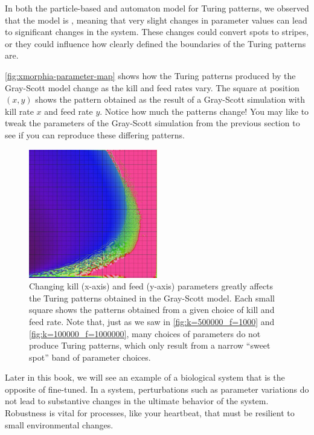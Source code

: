 In both the particle-based and automaton model for Turing patterns, we observed that the model is , meaning that very slight changes in parameter values can lead to significant changes in the system. These changes could convert spots to stripes, or they could influence how clearly defined the boundaries of the Turing patterns are.

\autoref{fig:xmorphia-parameter-map} shows how the Turing patterns produced by the Gray-Scott model change as the kill and feed rates vary. The square at position $(x, y)$ shows the pattern obtained as the result of a Gray-Scott simulation with kill rate $x$ and feed rate $y$. Notice how much the patterns change! You may like to tweak the parameters of the Gray-Scott simulation from the previous section to see if you can reproduce these differing patterns.\\

\begin{figure}[h]
\centering
\mySfFamily
\includegraphics[width = 0.5\textwidth]{../images_CMYK/xmorphia-parameter-map}
\caption{Changing kill (x-axis) and feed (y-axis) parameters greatly affects the Turing patterns obtained in the Gray-Scott model. Each small square shows the patterns obtained from a given choice of kill and feed rate.  Note that, just as we saw in \autoref{fig:k=500000_f=1000} and \autoref{fig:k=100000_f=1000000}, many choices of parameters do not produce Turing patterns, which only result from a narrow ``sweet spot'' band of parameter choices.}
\label{fig:xmorphia-parameter-map}
\end{figure}

Later in this book, we will see an example of a biological system that is the opposite of fine-tuned. In a  system, perturbations such as parameter variations do not lead to substantive changes in the ultimate behavior of the system. Robustness is vital for processes, like your heartbeat, that must be resilient to small environmental changes.

